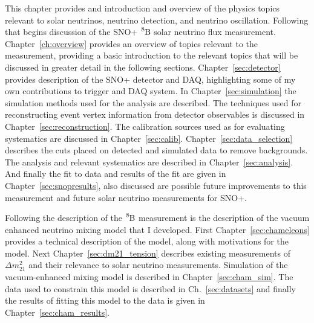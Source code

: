 This chapter provides and introduction and overview of the physics topics
relevant to solar neutrinos, neutrino detection, and neutrino oscillation.
Following that begins discussion of the SNO+ $\ce{^{8}B}$ solar neutrino flux
measurement.
Chapter~\ref{ch:overview} provides an overview of topics relevant to the measurement,
providing a basic introduction to the relevant topics that will be discussed
in greater detail in the following sections.
Chapter~\ref{sec:detector} provides description of the SNO+ detector and DAQ,
highlighting some of my own contributions to trigger and DAQ system.
In Chapter~\ref{sec:simulation} the simulation methods used for the analysis
are described.
The techniques used for reconstructing event vertex information from detector
observables is discussed in Chapter~\ref{sec:reconstruction}.
The calibration sources used as for evaluating systematics are discussed in Chapter~\ref{sec:calib}.
Chapter~\ref{sec:data_selection} describes the cuts placed on detected and simulated
data to remove backgrounds.
The analysis and relevant systematics are described in Chapter~\ref{sec:analysis}.
And finally the fit to data and results of the fit are given in Chapter~\ref{sec:snopresults},
also discussed are possible future improvements to this measurement and future solar
neutrino measurements for SNO+.

Following the description of the $\ce{^{8}B}$ measurement is the description
of the vacuum enhanced neutrino mixing model that I developed.
First Chapter~\ref{sec:chameleons} provides a technical description of the model,
along with motivations for the model.
Next Chapter~\ref{sec:dm21_tension} describes existing measurements of
$\Delta m^{2}_{21}$ and their relevance to solar neutrino measurements.
Simulation of the vacuum-enhanced mixing model is described in Chapter~\ref{sec:cham_sim}.
The data used to constrain this model is described in Ch.~\ref{sec:datasets}
and finally the results of fitting this model to the data is given
in Chapter~\ref{sec:cham_results}.

%
%
